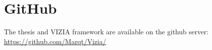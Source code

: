 
\chapter{GitHub}
The thesis and VIZIA framework are available on the github server: \\
\url{https://github.com/Marqt/Vizia/}

